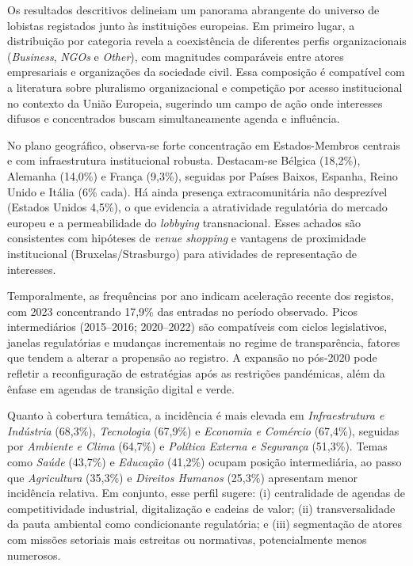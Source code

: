 Os resultados descritivos delineiam um panorama abrangente do universo de lobistas registados junto às instituições europeias. Em primeiro lugar, a distribuição por categoria revela a coexistência de diferentes perfis organizacionais (\textit{Business}, \textit{NGOs} e \textit{Other}), com magnitudes comparáveis entre atores empresariais e organizações da sociedade civil. Essa composição é compatível com a literatura sobre pluralismo organizacional e competição por acesso institucional no contexto da União Europeia, sugerindo um campo de ação onde interesses difusos e concentrados buscam simultaneamente agenda e influência.

No plano geográfico, observa-se forte concentração em Estados-Membros centrais e com infraestrutura institucional robusta. Destacam-se Bélgica (18,2\%), Alemanha (14,0\%) e França (9,3\%), seguidas por Países Baixos, Espanha, Reino Unido e Itália (6\% cada). Há ainda presença extracomunitária não desprezível (Estados Unidos 4,5\%), o que evidencia a atratividade regulatória do mercado europeu e a permeabilidade do \textit{lobbying} transnacional. Esses achados são consistentes com hipóteses de \textit{venue shopping} e vantagens de proximidade institucional (Bruxelas/Strasburgo) para atividades de representação de interesses.

Temporalmente, as frequências por ano indicam aceleração recente dos registos, com 2023 concentrando 17,9\% das entradas no período observado. Picos intermediários (2015--2016; 2020--2022) são compatíveis com ciclos legislativos, janelas regulatórias e mudanças incrementais no regime de transparência, fatores que tendem a alterar a propensão ao registro. A expansão no pós-2020 pode refletir a reconfiguração de estratégias após as restrições pandémicas, além da ênfase em agendas de transição digital e verde.

Quanto à cobertura temática, a incidência é mais elevada em \textit{Infraestrutura e Indústria} (68,3\%), \textit{Tecnologia} (67,9\%) e \textit{Economia e Comércio} (67,4\%), seguidas por \textit{Ambiente e Clima} (64,7\%) e \textit{Política Externa e Segurança} (51,3\%). Temas como \textit{Saúde} (43,7\%) e \textit{Educação} (41,2\%) ocupam posição intermediária, ao passo que \textit{Agricultura} (35,3\%) e \textit{Direitos Humanos} (25,3\%) apresentam menor incidência relativa. Em conjunto, esse perfil sugere: (i) centralidade de agendas de competitividade industrial, digitalização e cadeias de valor; (ii) transversalidade da pauta ambiental como condicionante regulatória; e (iii) segmentação de atores com missões setoriais mais estreitas ou normativas, potencialmente menos numerosos.

